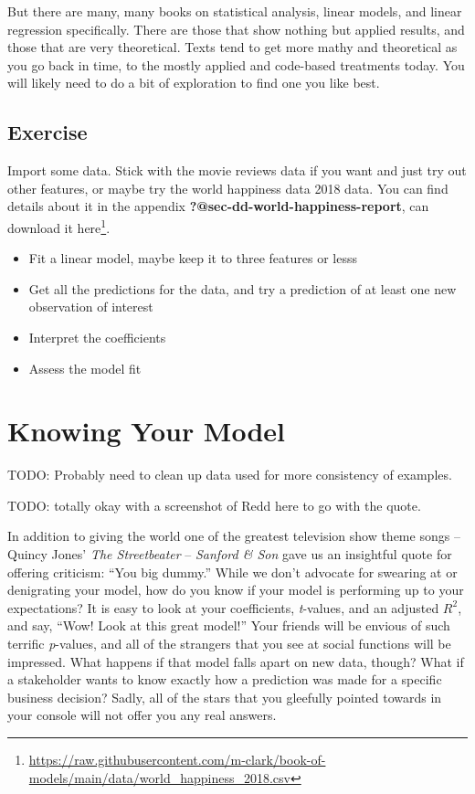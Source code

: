 \documentclass[
  letterpaper,
]{krantz}
\providecommand{\tightlist}{%
  \setlength{\itemsep}{0pt}\setlength{\parskip}{0pt}}\usepackage{longtable,booktabs,array}
\DeclareRobustCommand{\href}[2]{#2\footnote{\url{#1}}}
\begin{document}
But there are many, many books on statistical analysis, linear models,
and linear regression specifically. There are those that show nothing
but applied results, and those that are very theoretical. Texts tend to
get more mathy and theoretical as you go back in time, to the mostly
applied and code-based treatments today. You will likely need to do a
bit of exploration to find one you like best.

\section{Exercise}\label{sec-lm-exercise}

Import some data. Stick with the movie reviews data if you want and just
try out other features, or maybe try the world happiness data 2018 data.
You can find details about it in the appendix
\textbf{?@sec-dd-world-happiness-report}, can download it
\href{https://raw.githubusercontent.com/m-clark/book-of-models/main/data/world_happiness_2018.csv}{here}.

\begin{itemize}
\tightlist
\item
  Fit a linear model, maybe keep it to three features or lesss
\item
  Get all the predictions for the data, and try a prediction of at least
  one new observation of interest
\item
  Interpret the coefficients
\item
  Assess the model fit
\end{itemize}

\chapter{Knowing Your Model}\label{sec-knowing}

TODO: Probably need to clean up data used for more consistency of
examples.

TODO: totally okay with a screenshot of Redd here to go with the quote.

In addition to giving the world one of the greatest television show
theme songs -- Quincy Jones' \emph{The Streetbeater} -- \emph{Sanford \&
Son} gave us an insightful quote for offering criticism: ``You big
dummy.'' While we don't advocate for swearing at or denigrating your
model, how do you know if your model is performing up to your
expectations? It is easy to look at your coefficients, \emph{t}-values,
and an adjusted \(R^2\), and say, ``Wow! Look at this great model!''
Your friends will be envious of such terrific \emph{p}-values, and all
of the strangers that you see at social functions will be impressed.
What happens if that model falls apart on new data, though? What if a
stakeholder wants to know exactly how a prediction was made for a
specific business decision? Sadly, all of the stars that you gleefully
pointed towards in your console will not offer you any real answers.
\end{document}
